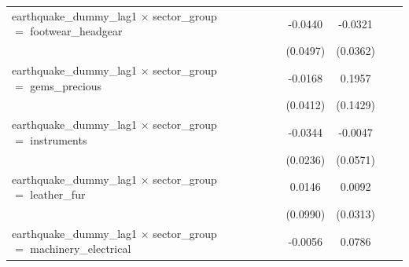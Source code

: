 \begin{tabular}{lcccccccc}
   earthquake\_dummy\_lag1 $\times$ sector\_group $=$ footwear\_headgear          &                       &                       &                       &                       & -0.0440               & -0.0321               &                       &   \\   
                                                                                  &                       &                       &                       &                       & (0.0497)              & (0.0362)              &                       &   \\   
   earthquake\_dummy\_lag1 $\times$ sector\_group $=$ gems\_precious              &                       &                       &                       &                       & -0.0168               & 0.1957                &                       &   \\   
                                                                                  &                       &                       &                       &                       & (0.0412)              & (0.1429)              &                       &   \\   
   earthquake\_dummy\_lag1 $\times$ sector\_group $=$ instruments                 &                       &                       &                       &                       & -0.0344               & -0.0047               &                       &   \\   
                                                                                  &                       &                       &                       &                       & (0.0236)              & (0.0571)              &                       &   \\   
   earthquake\_dummy\_lag1 $\times$ sector\_group $=$ leather\_fur                &                       &                       &                       &                       & 0.0146                & 0.0092                &                       &   \\   
                                                                                  &                       &                       &                       &                       & (0.0990)              & (0.0313)              &                       &   \\   
   earthquake\_dummy\_lag1 $\times$ sector\_group $=$ machinery\_electrical       &                       &                       &                       &                       & -0.0056               & 0.0786                &                       &   \\   

\end{tabular}

